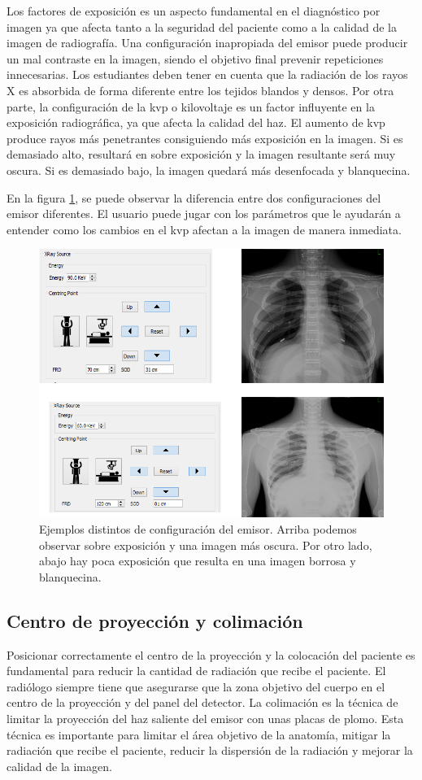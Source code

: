 Los factores de exposición es un aspecto fundamental en el diagnóstico por imagen ya que afecta tanto a la seguridad del paciente como a la calidad de la imagen de radiografía. Una configuración inapropiada del emisor puede producir un mal contraste en la imagen, siendo el objetivo final prevenir repeticiones innecesarias. Los estudiantes deben tener en cuenta que la radiación de los rayos X es absorbida de forma diferente entre los tejidos blandos y densos. Por otra parte, la configuración de la \ac{kvp} o kilovoltaje es un factor influyente en la exposición radiográfica, ya que afecta la calidad del haz. El aumento de \ac{kvp} produce rayos más penetrantes consiguiendo más exposición en la imagen. Si es demasiado alto, resultará en sobre exposición y la imagen resultante será muy oscura. Si es demasiado bajo, la imagen quedará más desenfocada y blanquecina.

En la figura \ref{fig:setup}, se puede observar la diferencia entre dos configuraciones del emisor diferentes. El usuario puede jugar con los parámetros que le ayudarán a entender como los cambios en el \ac{kvp} afectan a la imagen de manera inmediata. 




\begin{figure}[tb]
\centering
\includegraphics[width=0.5\linewidth]{IMG/setup.png}
\caption{\label{fig:setup} Ejemplos distintos de configuración del emisor. Arriba podemos observar sobre exposición y una imagen más oscura. Por otro lado, abajo hay poca exposición que resulta en una imagen borrosa y blanquecina. }
\end{figure}

\subsection{Centro de proyección y colimación}

Posicionar correctamente el centro de la proyección y la colocación del paciente es fundamental para reducir la cantidad de radiación que recibe el paciente. El radiólogo siempre tiene que asegurarse que la zona objetivo del cuerpo en el centro de la proyección y del panel del detector. La colimación es la técnica de limitar la proyección del haz saliente del emisor con unas placas de plomo. Esta técnica es importante para limitar el área objetivo de la anatomía, mitigar la radiación que recibe el paciente, reducir la dispersión de la radiación y mejorar la calidad de la imagen.  

